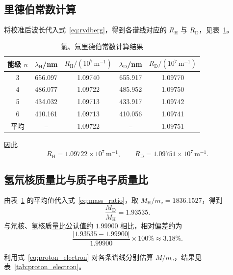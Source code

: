 \documentclass[12pt,a4paper]{article}
\begin{document}
\subsection{里德伯常数计算}
将校准后波长代入式~\eqref{eq:rydberg}，得到各谱线对应的 $R_{\mathrm H}$ 与 $R_{\mathrm D}$，见表~\ref{tab:rydberg}。

\begin{table}[htbp]
    \centering
    \caption{氢、氘里德伯常数计算结果}
    \label{tab:rydberg}
    \begin{tabular}{ccccc}
        \toprule
        能级 $n$ & $\lambda_{\mathrm H}$/nm & $R_{\mathrm H}/(10^7\,\mathrm{m}^{-1})$ & $\lambda_{\mathrm D}$/nm & $R_{\mathrm D}/(10^7\,\mathrm{m}^{-1})$ \\
        \midrule
        3 & 656.097 & 1.09740 & 655.917 & 1.09770 \\
        4 & 486.077 & 1.09722 & 485.952 & 1.09750 \\
        5 & 434.032 & 1.09713 & 433.917 & 1.09742 \\
        6 & 410.161 & 1.09713 & 410.056 & 1.09741 \\
        \midrule
        平均 & -- & 1.09722 & -- & 1.09751 \\
        \bottomrule
    \end{tabular}
\end{table}

因此
\begin{equation}
    R_{\mathrm H}=1.09722\times10^7\,\mathrm{m}^{-1},\qquad
    R_{\mathrm D}=1.09751\times10^7\,\mathrm{m}^{-1}.
\end{equation}

\subsection{氢氘核质量比与质子电子质量比}
由表~\ref{tab:rydberg} 的平均值代入式~\eqref{eq:mass_ratio}，取 $M_{\mathrm H}/m_{\mathrm e}=1836.1527$，得到
\begin{equation}
    \frac{M_{\mathrm D}}{M_{\mathrm H}}=1.93535.
\end{equation}
与氘核、氢核质量比公认值约 $1.99900$ 相比，相对偏差约为
\begin{equation}
    \frac{|1.93535-1.99900|}{1.99900}\times100\%\approx3.18\%.
\end{equation}

利用式~\eqref{eq:proton_electron} 对各条谱线分别估算 $M/m_{\mathrm e}$，结果见表~\ref{tab:proton_electron}。
\end{document}
